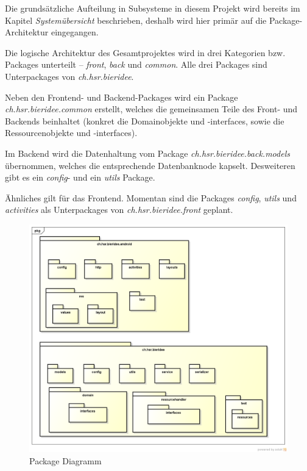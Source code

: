 \documentclass[10pt,a4paper]{scrartcl}
\begin{document}
Die grundsätzliche Aufteilung in Subsysteme in diesem Projekt wird bereits im Kapitel
\textit{Systemübersicht} beschrieben, deshalb wird hier primär auf die Package-Architektur
eingegangen.

Die logische Architektur des Gesamtprojektes wird in drei Kategorien bzw. Packages unterteilt --
\textit{front}, \textit{back} und \textit{common}. Alle drei Packages sind Unterpackages von
\textit{ch.hsr.bieridee}.

Neben den Frontend- und Backend-Packages wird ein Package \textit{ch.hsr.bieridee.common} erstellt,
welches die gemeinsamen Teile des Front- und Backends beinhaltet (konkret die Domainobjekte und
-interfaces, sowie die Ressourcenobjekte und -interfaces).

Im Backend wird die Datenhaltung vom Package \textit{ch.hsr.bieridee.back.models} übernommen,
welches die entsprechende Datenbanknode kapselt. Desweiteren gibt es ein \textit{config}- und ein
\textit{utils} Package.

Ähnliches gilt für das Frontend. Momentan sind die Packages \textit{config}, \textit{utils} und
\textit{activities} als Unterpackages von \textit{ch.hsr.bieridee.front} geplant.

\begin{figure}[H]
	\includegraphics[width=\textwidth]{PackageDiagramm.png}
	\caption{Package Diagramm}
	\label{fig:package_diagram}
\end{figure}
\end{document}
